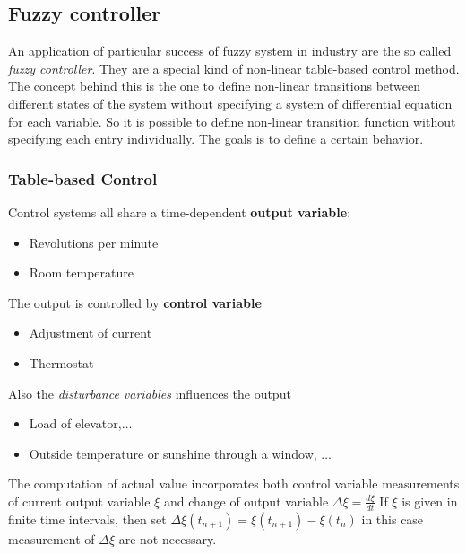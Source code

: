 \documentclass{article}
\begin{document}
\subsection{Fuzzy controller}
An application of particular success of fuzzy system
in industry are the so called \textit{fuzzy controller}. They are a
special kind of non-linear table-based control method.
\newline\newline
The concept behind this is the one to define non-linear transitions between different states
of the system without specifying a system of differential equation for each variable.
So it is possible to define non-linear transition function without specifying each entry individually.
The goals is to define a certain behavior.

\subsubsection{Table-based Control}
Control systems all share a time-dependent \textbf{output variable}:
\begin{itemize}
    \item Revolutions per minute
    \item Room temperature
\end{itemize}
The output is controlled by \textbf{control variable}
\begin{itemize}
    \item Adjustment of current
    \item Thermostat
\end{itemize}
Also the \textit{disturbance variables} influences the output
\begin{itemize}
    \item Load of elevator,$\dots$
    \item Outside temperature or sunshine through a window, $\dots$
\end{itemize}
The computation of actual value incorporates both control variable measurements of current
output variable $\xi$ and change of output variable $\Delta\xi=\frac{d\xi}{dt}$
\newline\newline
If $\xi$ is given in finite time intervals, then set $\Delta\xi (t_{n+1})=\xi (t_{n+1})-\xi(t_n)$
in this case measurement of $\Delta\xi$ are not necessary.
\end{document}
